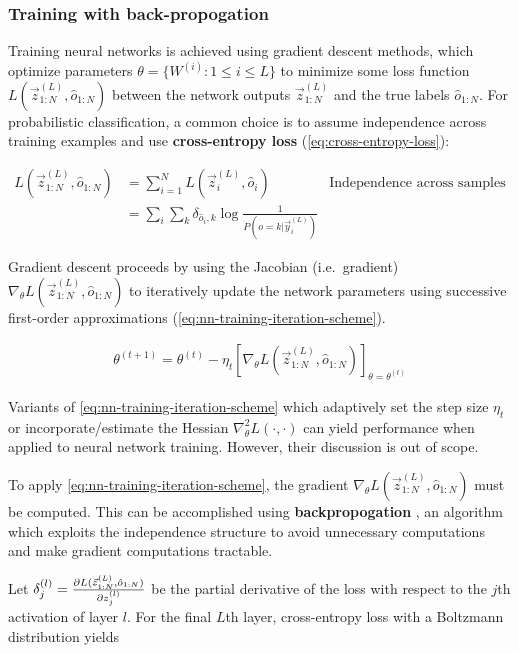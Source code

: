 \subsubsection{Training with back-propogation}

Training neural networks is achieved using gradient descent methods, which
optimize parameters $\theta = \{W^{(i)} : 1 \leq i \leq L \}$ to minimize some
loss function $L(\vec{z}^{(L)}_{1:N}, \hat{o}_{1:N})$ between the network
outputs $\vec{z}^{(L)}_{1:N}$ and the true labels $\hat{o}_{1:N}$. For
probabilistic classification, a common choice is to assume independence
across training examples and use \textbf{cross-entropy loss}
(\autoref{eq:cross-entropy-loss}):

\begin{align}
    L(\vec{z}^{(L)}_{1:N}, \hat{o}_{1:N})
    &= \sum_{i=1}^{N} L(\vec{z}^{(L)}_i, \hat{o}_i) &\mbox{Independence across samples} \nonumber\\
    &= \sum_i \sum_k \delta_{\hat{o}_i,k} \log \frac{1}{P(o=k | \vec{y}_i^{(L)})} & \label{eq:cross-entropy-loss}
\end{align}

Gradient descent proceeds by using the Jacobian (i.e.\ gradient) $\nabla_\theta
L(\vec{z}^{(L)}_{1:N}, \hat{o}_{1:N})$ to iteratively update the network
parameters using successive first-order approximations (\autoref{eq:nn-training-iteration-scheme}).

\begin{align}
    \label{eq:nn-training-iteration-scheme}
    \theta^{(t+1)} = \theta^{(t)}
    - \eta_t \left[ \nabla_\theta L(\vec{z}^{(L)}_{1:N}, \hat{o}_{1:N}) \right]_{\theta = \theta^{(t)}}
\end{align}

Variants of \autoref{eq:nn-training-iteration-scheme} which adaptively set the
step size $\eta_t$ or incorporate/estimate the Hessian $\nabla^2_{\theta}
L(\cdot, \cdot)$ can yield performance when applied to neural network training.
However, their discussion is out of scope. 

To apply \autoref{eq:nn-training-iteration-scheme}, the gradient $\nabla_\theta
L(\vec{z}^{(L)}_{1:N}, \hat{o}_{1:N})$ must be computed. This can be
accomplished using \textbf{backpropogation} , an algorithm which
exploits the independence structure to avoid unnecessary computations and make
gradient computations tractable.

Let $\delta^{(l)}_{j} = \frac{\partial L(\vec{z}^{(L)}_{1:N}, \hat{o}_{1:N})}{\partial
z^{(l)}_j}$ be the partial derivative of the loss with respect to the $j$th
activation of layer $l$. For the final $L$th layer, cross-entropy loss
with a Boltzmann distribution yields

